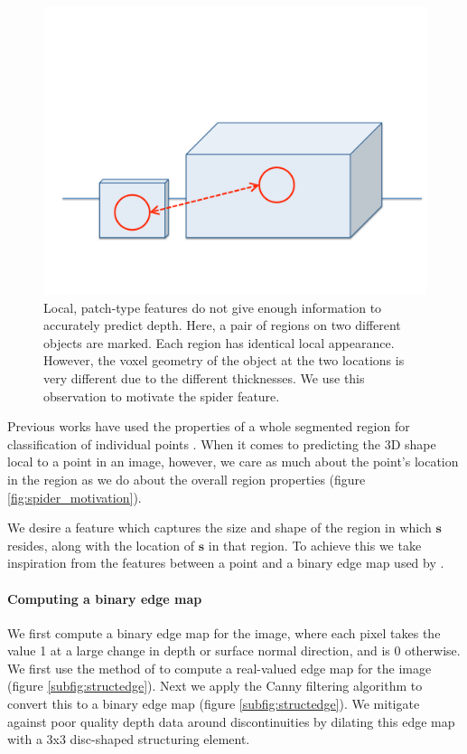 \documentclass[10pt,twocolumn,letterpaper]{article}
\newcommand{\pixelidx}{\mathbf{s}}
\newcommand{\todo}[1]{\textcolor{red}{TODO: #1}}
\begin{document}
\begin{figure}[bt]
  \centering 
  \includegraphics[width=0.9\columnwidth]{features_1}
  \caption{Local, patch-type features do not give enough information to accurately predict depth. Here, a pair of regions on two different objects are marked. Each region has identical local appearance. However, the voxel geometry of the object at the two locations is very different due to the different thicknesses. 
  We use this observation to motivate the spider feature.}
  \label{fig:patch_problems}
\end{figure}


Previous works have used the properties of a whole segmented region for classification of individual points \cite{golovinskiy-iccv-2009}.
When it comes to predicting the 3D shape local to a point in an image, however, we care as much about the point's location in the region as we do about the overall region properties (figure \ref{fig:spider_motivation}).

We desire a feature which captures the size and shape of the region in which $\pixelidx$ resides, along with the location of $\pixelidx$ in that region.
To achieve this we take inspiration from the features between a point and a binary edge map used by \cite{drost-3dimpvt-2012}.

\paragraph{Computing a binary edge map}
We first compute a binary edge map for the image, where each pixel takes the value 1 at a large change in depth or surface normal direction, and is 0 otherwise.
We first use the method of \cite{dollar-iccv-2013} to compute a real-valued edge map for the image (figure \ref{subfig:structedge}).
Next we apply the Canny filtering algorithm \cite{canny-pami-1986} to convert this to a binary edge map (figure \ref{subfig:structedge}).
We mitigate against poor quality depth data around discontinuities by dilating this edge map with a 3x3 disc-shaped structuring element.
\end{document}
